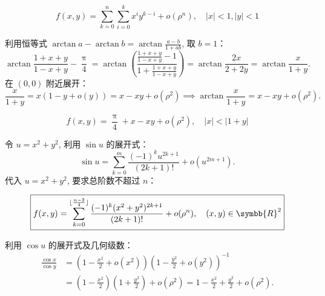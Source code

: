 \begin{solution}
    \begin{equation}
        \boxed{f(x, y) = \sum_{k=0}^n \sum_{i=0}^k x^i y^{k-i} + o(\rho^n), \quad |x| < 1, |y| < 1}
    \end{equation}


    利用恒等式 $\arctan a - \arctan b = \arctan \frac{a-b}{1+ab}$, 取 $b=1$：
    \begin{equation}
        \arctan \frac{1+x+y}{1-x+y} - \frac{\uppi}{4} = \arctan \left( \frac{\frac{1+x+y}{1-x+y} - 1}{1 + \frac{1+x+y}{1-x+y}} \right) = \arctan \frac{2x}{2+2y} = \arctan \frac{x}{1+y}.
    \end{equation}
    在 $(0,0)$ 附近展开：
    \begin{equation}
        \frac{x}{1+y} = x(1 - y + o(y)) = x - xy + o(\rho^2) \implies \arctan \frac{x}{1+y} = x - xy + o(\rho^2).
    \end{equation}

    \begin{equation}
        \boxed{f(x, y) = \frac{\uppi}{4} + x - xy + o(\rho^2), \quad |x| < |1+y|}
    \end{equation}


    令 $u = x^2 + y^2$, 利用 $\sin u$ 的展开式：
    \begin{equation}
        \sin u = \sum_{k=0}^m \frac{(-1)^k u^{2k+1}}{(2k+1)!} + o(u^{2m+1}).
    \end{equation}
    代入 $u = x^2 + y^2$, 要求总阶数不超过 $n$：

    \begin{equation}
        \boxed{f(x, y) = \sum_{k=0}^{\lfloor \frac{n-2}{4} \rfloor} \frac{(-1)^k (x^2+y^2)^{2k+1}}{(2k+1)!} + o(\rho^n), \quad (x, y) \in \symbb{R}^2}
    \end{equation}


    利用 $\cos u$ 的展开式及几何级数：
    \begin{equation}
        \begin{aligned}
            \frac{\cos x}{\cos y} & = \left( 1 - \frac{x^2}{2} + o(x^2) \right) \left( 1 - \frac{y^2}{2} + o(y^2) \right)^{-1}                                       \\
                                  & = \left( 1 - \frac{x^2}{2} \right) \left( 1 + \frac{y^2}{2} \right) + o(\rho^2) = 1 - \frac{x^2}{2} + \frac{y^2}{2} + o(\rho^2).
        \end{aligned}
    \end{equation}


\end{solution}
